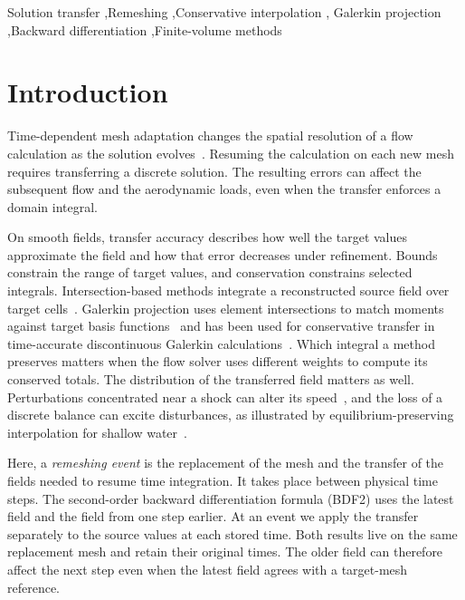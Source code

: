 \documentclass[a4paper,fleqn]{cas-sc}
\begin{document}
\begin{keywords}
Solution transfer \sep Remeshing \sep Conservative interpolation \sep
Galerkin projection \sep Backward differentiation \sep Finite-volume methods
\end{keywords}

\setlength{\hfuzz}{\dimexpr0.25\textwidth+1pt\relax}
\maketitle
\setlength{\hfuzz}{0.2pt}

\section{Introduction}
\label{sec:introduction}

Time-dependent mesh adaptation changes the spatial resolution of a flow calculation as the solution evolves~\cite{AlauzetLoseilleOlivier2018,SauvageAlauzetDervieux2024}. Resuming the calculation on each new mesh requires transferring a discrete solution. The resulting errors can affect the subsequent flow and the aerodynamic loads, even when the transfer enforces a domain integral.

On smooth fields, transfer accuracy describes how well the target values approximate the field and how that error decreases under refinement. Bounds constrain the range of target values, and conservation constrains selected integrals. Intersection-based methods integrate a reconstructed source field over target cells~\cite{DukowiczKodis1987,MargolinShashkov2003,AlauzetMehrenberger2010,Alauzet2016}. Galerkin projection uses element intersections to match moments against target basis functions~\cite{JiaoHeath2004,FarrellMaddison2011} and has been used for conservative transfer in time-accurate discontinuous Galerkin calculations~\cite{LevyMay2024,LevyMay2025}. Which integral a method preserves matters when the flow solver uses different weights to compute its conserved totals. The distribution of the transferred field matters as well. Perturbations concentrated near a shock can alter its speed~\cite{Guglielmi2026}, and the loss of a discrete balance can excite disturbances, as illustrated by equilibrium-preserving interpolation for shallow water~\cite{MaddisonCotterFarrell2011,MaddisonCotterFarrell2013}.

Here, a \emph{remeshing event} is the replacement of the mesh and the transfer of the fields needed to resume time integration. It takes place between physical time steps. The second-order backward differentiation formula (BDF2) uses the latest field and the field from one step earlier. At an event we apply the transfer separately to the source values at each stored time. Both results live on the same replacement mesh and retain their original times. The older field can therefore affect the next step even when the latest field agrees with a target-mesh reference.
\end{document}
